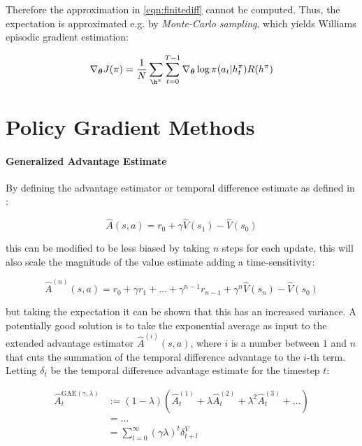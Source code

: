 
Therefore the approximation in \ref{eqn:finitediff} cannot be computed. Thus, the expectation is approximated e.g. by \textit{Monte-Carlo sampling}, which yields Williams \cite{williams_simple_1992} episodic gradient estimation:

\begin{equation}
    \nabla _{\boldsymbol{\theta}} J(\pi) = \frac{1}{N} \sum _{\h ^{\pi}} \sum ^{T-1} _{t = 0} \nabla _{\boldsymbol{\theta}} \log \pi(a _t | h _t ^{\pi}) R(h ^{\pi})
\end{equation}

\section{Policy Gradient Methods}

\paragraph{Generalized Advantage Estimate}
By defining the advantage estimator or temporal difference estimate as defined in \cite{schulman_high-dimensional_2018}:

\begin{equation}
    \hat{A}(s,a) = r _0 + \gamma \hat{V}(s _1) - \hat{V}(s _0)
\end{equation}


this can be modified to be less biased by taking $n$ steps for each update, this will also scale the magnitude of the value estimate adding a time-sensitivity:

\begin{equation}
\hat{A} ^{(n)} (s,a) = r _0 + \gamma r _1 + \dots + \gamma ^{n-1} r _{n-1} + \gamma ^n \hat{V}(s _n) - \hat{V}(s _0)
\end{equation}

but taking the expectation it can be shown that this has an increased variance. 
A potentially good solution is to take the exponential average as input to the extended advantage estimator $\hat{A} ^{(i)}(s, a) $, where $i$ is a number between $1$ and $n$ that cuts the summation of the temporal difference advantage to the $i$-th term. Letting $\delta _t$ be the temporal difference advantage estimate for the timestep $t$:


\begin{align}
\hat{A} _t ^{\text{GAE} (\gamma, \lambda)} & := (1 - \lambda)(\hat{A} _t ^{(1)} + \lambda \hat{A} _t ^{(2)} + \lambda ^2 \hat{A} _t ^{(3)} + \dots)  \\
& = \dots \nonumber \\
& = \sum ^{ \infty } _{l = 0} (\gamma \lambda) ^t \delta ^V _{t+l} \nonumber
\end{align}


